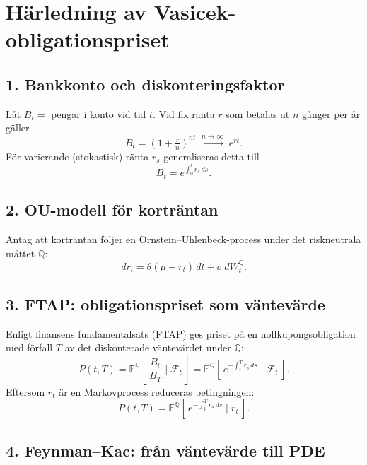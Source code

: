 \documentclass{article}
\begin{document}
\section*{Härledning av Vasicek-obligationspriset}

\subsection*{1. Bankkonto och diskonteringsfaktor}

Låt $B_t = $ pengar i konto vid tid $t$. Vid fix ränta $r$ som betalas ut $n$ gånger per år gäller
\[
B_t = \left(1 + \tfrac{r}{n}\right)^{nt} \;\xrightarrow{n \to \infty}\; e^{rt}.
\]
För varierande (stokastisk) ränta $r_s$ generaliseras detta till
\begin{equation}
B_t = e^{\int_0^t r_s\,ds}. \tag{$\star$}
\end{equation}

\subsection*{2. OU-modell för korträntan}

Antag att korträntan följer en Ornstein--Uhlenbeck-process under det riskneutrala måttet $\mathbb{Q}$:
\begin{equation}
dr_t = \theta(\mu - r_t)\,dt + \sigma\,dW_t^{\mathbb{Q}}.
\end{equation}

\subsection*{3. FTAP: obligationspriset som väntevärde}

Enligt finansens fundamentalsats (FTAP) ges priset på en nollkupongsobligation med förfall $T$ av det diskonterade väntevärdet under $\mathbb{Q}$:
\[
P(t,T) = \mathbb{E}^{\mathbb{Q}}\!\left[\, \frac{B_t}{B_T} \;\Big|\; \mathcal{F}_t \,\right]
       = \mathbb{E}^{\mathbb{Q}}\!\left[\, e^{-\int_t^T r_s\,ds} \;\Big|\; \mathcal{F}_t \,\right].
\]
Eftersom $r_t$ är en Markovprocess reduceras betingningen:
\begin{equation}
P(t,T) = \mathbb{E}^{\mathbb{Q}}\!\left[\, e^{-\int_t^T r_s\,ds} \;\Big|\; r_t \,\right].
\end{equation}

\subsection*{4. Feynman--Kac: från väntevärde till PDE}
\end{document}

